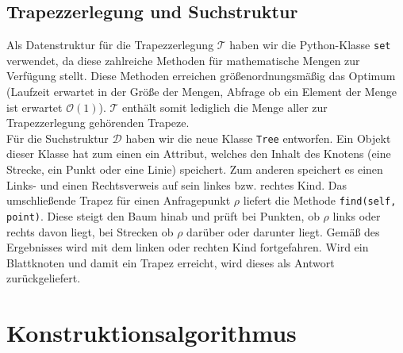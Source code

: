 \documentclass[11pt, a4paper]{article}
\newcommand{\T}{\ensuremath{\mathcal{T}} }
\newcommand{\D}{\ensuremath{\mathcal{D}} }
\begin{document}
\subsection{Trapezzerlegung und Suchstruktur}

Als Datenstruktur für die Trapezzerlegung \T haben wir die Python-Klasse \texttt{set} verwendet, da diese zahlreiche Methoden für mathematische Mengen zur Verfügung stellt. Diese Methoden erreichen größenordnungsmäßig das Optimum (Laufzeit erwartet in der Größe der Mengen, Abfrage ob ein Element der Menge ist erwartet $\mathcal{O}(1)$). \T enthält somit lediglich die Menge aller zur Trapezzerlegung gehörenden Trapeze.\\
Für die Suchstruktur \D haben wir die neue Klasse \texttt{Tree} entworfen. Ein Objekt dieser Klasse hat zum einen ein Attribut, welches den Inhalt des Knotens (eine Strecke, ein Punkt oder eine Linie) speichert. Zum anderen speichert es einen Links- und einen Rechtsverweis auf sein linkes bzw. rechtes Kind. Das umschließende Trapez für einen Anfragepunkt $\rho$ liefert die Methode \texttt{find(self, point)}. Diese steigt den Baum hinab und prüft bei Punkten, ob $\rho$ links oder rechts davon liegt, bei Strecken ob $\rho$ darüber oder darunter liegt. Gemäß des Ergebnisses wird mit dem linken oder rechten Kind fortgefahren. Wird ein Blattknoten und damit ein Trapez erreicht, wird dieses als Antwort zurückgeliefert.

\section{Konstruktionsalgorithmus}
\end{document}
